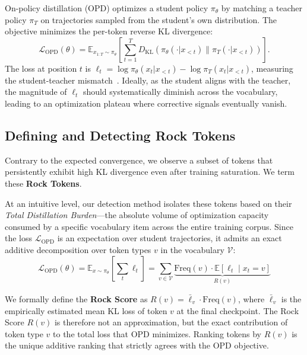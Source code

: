 On-policy distillation (OPD) optimizes a student policy $\pi_\theta$ by matching a teacher policy $\pi_T$ on trajectories sampled from the student's own distribution. The objective minimizes the per-token reverse KL divergence:
\begin{equation}
\mathcal{L}_{\mathrm{OPD}}(\theta) = \mathbb{E}_{x_{1:T} \sim \pi_\theta} \left[ \sum_{t=1}^{T} D_{\mathrm{KL}} \left( \pi_\theta(\cdot | x_{<t}) \| \pi_T(\cdot | x_{<t}) \right) \right].
\end{equation}
The loss at position $t$ is $\ell_t = \log \pi_\theta(x_t | x_{<t}) - \log \pi_T(x_t | x_{<t})$, measuring the student-teacher mismatch~\cite{fu2026revisiting}. Ideally, as the student aligns with the teacher, the magnitude of $\ell_t$ should systematically diminish across the vocabulary, leading to an optimization plateau where corrective signals eventually vanish.

\subsection{Defining and Detecting Rock Tokens}
\label{sec:rock_tokens}

Contrary to the expected convergence, we observe a subset of tokens that persistently exhibit high KL divergence even after training saturation. We term these \textbf{Rock Tokens}. 

At an intuitive level, our detection method isolates these tokens based on their \textit{Total Distillation Burden}—the absolute volume of optimization capacity consumed by a specific vocabulary item across the entire training corpus. Since the loss $\mathcal{L}_{\mathrm{OPD}}$ is an expectation over student trajectories, it admits an exact additive decomposition over token types $v$ in the vocabulary $\mathcal{V}$:
\begin{equation}
\mathcal{L}_{\text{OPD}}(\theta) = \mathbb{E}_{x \sim \pi_\theta} \left[ \sum_{t} \ell_t \right] = \sum_{v \in \mathcal{V}} \underbrace{\text{Freq}(v) \cdot \mathbb{E}[\ell_t \mid x_t = v]}_{R(v)}
\end{equation}

We formally define the \textbf{Rock Score} as $R(v) = \bar{\ell}_v \cdot \mathrm{Freq}(v)$, where $\bar{\ell}_v$ is the empirically estimated mean KL loss of token $v$ at the final checkpoint. The Rock Score $R(v)$ is therefore not an approximation, but the exact contribution of token type $v$ to the total loss that OPD minimizes. Ranking tokens by $R(v)$ is the unique additive ranking that strictly agrees with the OPD objective.

